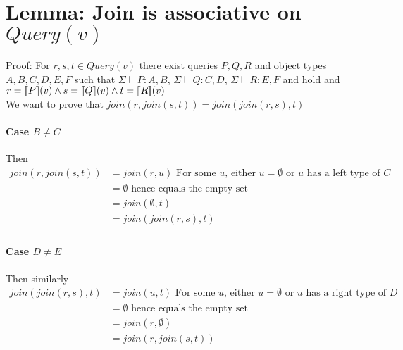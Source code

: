 \documentclass[12pt,a4paper,twoside,openright]{report}
\newcommand{\db}[1]{{\bf [\![}#1{\bf ]\!]}}
\newcommand{\deno}[1]{\db{#1}(v)}
\newcommand{\typeRule}[2]{\Sigma\vdash #1 \colon #2}
\newcommand{\query}[0]{Query(v)}
\begin{document}
{{\section{Lemma: Join is associative on $\query$}
Proof: For $r, s, t \in \query$ there exist queries $P, Q, R$ and object types $A, B, C, D, E, F$ such that $\typeRule{P}{A, B}$, $\typeRule{Q}{C, D}$, $\typeRule{R}{E, F}$ and  hold and $r = \deno{P} \wedge s = \deno{Q} \wedge t = \deno{R}$
\\We want to prove that $join(r, join(s, t)) = join(join(r, s), t)$
\paragraph{Case $B \neq C$}
	Then 
	\begin{equation}\label{Case B != C}
	\begin{split}
		join(r, join(s, t)) & = join(r, u) \mbox{ For some $u$, either $u = \emptyset$ or $u$ has a left type of $C$}\\
							& = \emptyset \mbox{ hence equals the empty set}\\
							& = join(\emptyset, t)\\
							& = join(join(r, s), t) \\
	\end{split}
	\end{equation}
	
\paragraph{Case $D \neq E$}
Then similarly
	\begin{equation}\label{Case D != E}
	\begin{split}
		join(join(r, s), t) & = join(u, t) \mbox{ For some $u$, either $u = \emptyset$ or $u$ has a right type of $D$}\\
							& = \emptyset \mbox{ hence equals the empty set}\\
							& = join(r, \emptyset)\\
							& = join(r, join(s, t)) \\
	\end{split}
	\end{equation}
	
}}
\end{document}

